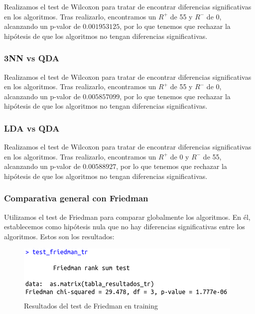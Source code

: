 Realizamos el test de Wilcoxon para tratar de encontrar diferencias significativas en los algoritmos. Tras realizarlo, encontramos un $R^{+}$ de 55 y $R^{-}$ de 0, alcanzando un p-valor de $0.001953125$, por lo que tenemos que rechazar la hipótesis de que los algoritmos no tengan diferencias significativas.

\subsubsection{3NN vs QDA}

Realizamos el test de Wilcoxon para tratar de encontrar diferencias significativas en los algoritmos. Tras realizarlo, encontramos un $R^{+}$ de 55 y $R^{-}$ de 0, alcanzando un p-valor de $0.005857099$, por lo que tenemos que rechazar la hipótesis de que los algoritmos no tengan diferencias significativas.

\subsubsection{LDA vs QDA}

Realizamos el test de Wilcoxon para tratar de encontrar diferencias significativas en los algoritmos. Tras realizarlo, encontramos un $R^{+}$ de 0 y $R^{-}$ de 55, alcanzando un p-valor de $0.00588927$, por lo que tenemos que rechazar la hipótesis de que los algoritmos no tengan diferencias significativas.


\subsubsection{Comparativa general con Friedman}

Utilizamos el test de Friedman para comparar globalmente los algoritmos. En él, establecemos como hipótesis nula que no hay diferencias significativas entre los algoritmos. Estos son los resultados:

\begin{figure}[H] %
	\centering
	\includegraphics[scale=0.6]{friedman-tr-c.png}  %
	\caption{Resultados del test de Friedman en training} 
	\label{fig:f-c-tr}
\end{figure}

